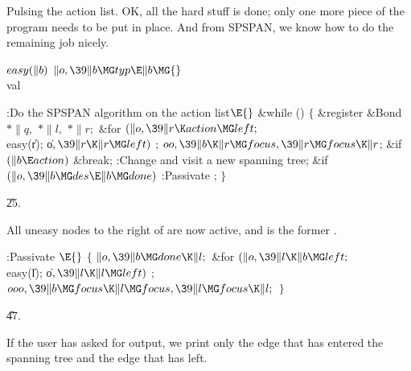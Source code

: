 Pulsing the action list. OK, all the hard stuff is
done; only one
more piece of the program needs to be put in place. And from {\mc SPSPAN},
we know how to do the remaining job nicely.

\Y\B\4\D$\\{easy}(\|b)$ \5
$\|o,\39\|b\MG\\{typ}\E\|b\MG{}$\\{val}\par
\Y\B\4:Do the {\mc SPSPAN} algorithm on the action list\X${}\E{}$\6
\&{while} ()\5
${}\{{}$\1\6
\&{register} \&{Bond} ${}{*}\|q,{}$ ${}{*}\|l,{}$ ${}{*}\|r;{}$\7
\&{for} ${}(\|o,\39\|r\K\\{action}\MG\\{left};{}$ \\{easy}(\|r); \|o${},\39\|r%
\K\|r\MG\\{left}){}$\1\5
;\2\6
${}\\{oo},\39\|b\K\|r\MG\\{focus},\39\|r\MG\\{focus}\K\|r{}$;\6
\&{if} ${}(\|b\E\\{action}){}$\1\5
\&{break};\2\6
:Change  and visit a new spanning tree\X;\6
\&{if} ${}(\|o,\39\|b\MG\\{des}\E\|b\MG\\{done}){}$\1\5
:Passivate \X;\2\6
\4${}\}{}$\2\par
\U25.\fi

All uneasy nodes to the right of  are now
active, and  is the
former .

\Y\B\4:Passivate \X${}\E{}$\6
${}\{{}$\1\6
${}\|o,\39\|b\MG\\{done}\K\|l;{}$\6
\&{for} ${}(\|o,\39\|l\K\|b\MG\\{left};{}$ \\{easy}(\|l); \|o${},\39\|l\K\|l\MG%
\\{left}){}$\1\5
;\2\6
${}\\{ooo},\39\|b\MG\\{focus}\K\|l\MG\\{focus},\39\|l\MG\\{focus}\K\|l;{}$\6
\4${}\}{}$\2\par
\U47.\fi

If the user has asked for  output, we
print only the
edge that has entered the spanning tree and the edge that has left.

